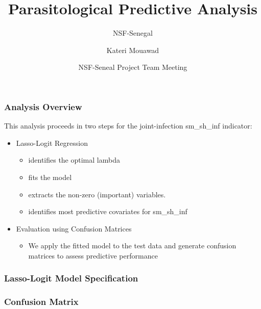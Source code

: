\documentclass{beamer}
\title[Predictive Analysis] %
{Parasitological Predictive Analysis}
\subtitle{NSF-Senegal}
\author{Kateri Mouawad} %
\date[June 2025] %
{NSF-Seneal Project Team Meeting}
\begin{document}
\frame{\titlepage}

\begin{frame}
\frametitle{Analysis Overview}
This analysis proceeds in two steps for the joint-infection sm\_sh\_inf indicator:

\begin{itemize}
    \item<1-> Lasso-Logit Regression
       \begin{itemize}
             \item<2-> identifies the optimal lambda
             \item<3-> fits the model
             \item<4-> extracts the non-zero (important) variables.
             \item<5-> identifies most predictive covariates for sm\_sh\_inf
        \end{itemize}
    \item<3-> Evaluation using Confusion Matrices
         \begin{itemize}
                 \item<4-> We apply the fitted model to the test data and generate confusion matrices to assess predictive performance
         \end{itemize}
\end{itemize}

\end{frame}


\begin{frame}
\frametitle{Lasso-Logit Model Specification}




\end{frame}

\begin{frame}
\frametitle{Confusion Matrix}





\end{frame}
\end{document}
